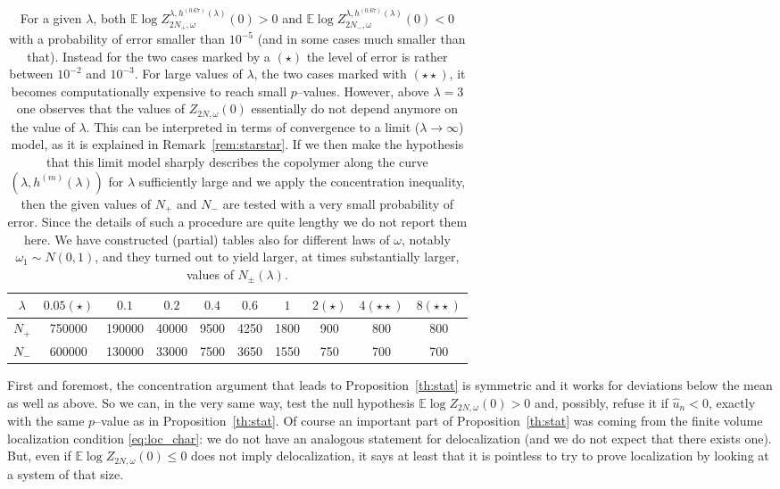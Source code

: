 \documentclass[reqno,11pt]{amsart}
\numberwithin{equation}{section}
\newcommand{\bbE}{{\ensuremath{\mathbb E}} }
\newcommand{\go}{\omega}
\newcommand{\gl}{\lambda}
\begin{document}
\begin{table}[h]
\begin{center}
\begin{tabular}{|c|c|c|c|c|c|c|c|c|c|}
\hline
$\gl $ &$0.05 (\star)$&$0.1$&$0.2$&$0.4$&$0.6$&$1$&$2(\star)$&$4(\star\star )$&$8(\star\star )$\\
\hline
$N_+$&750000&190000&40000&9500&4250&1800&900&800&800\\
\hline
$N_-$&600000&130000&33000&7500&3650&1550&750&700&700\\
\hline
\end{tabular}
\end{center}
\caption{\label{tbl:2}
For a given $\gl$, both $\bbE \log Z_{2N_+,\go}^{\gl,h^{(0.67)}(\gl)}(0)  >0$ and
$\bbE \log Z_{2N_-,\go}^{\gl,h^{(0.67)}(\gl)}(0)  <0$ with a probability of error
smaller than $10^{-5}$ (and in some cases much smaller than that).
Instead for the two cases marked by a $(\star)$ the level of error
is rather between $10^{-2}$ and  $10^{-3}$. For large values of $\gl$, the two cases marked with
 $(\star \star)$, it becomes computationally
expensive to reach small $p$--values. However, above $\gl=3$ one observes
that the values of $Z_{2N,\go}(0)$
essentially do not depend anymore on the value of $\gl$. This can be interpreted
in terms of convergence to a limit ($\gl \to \infty$) model, as it is explained in Remark~\ref{rem:starstar}.
If we then make the hypothesis that this limit model sharply describes the
copolymer along the curve $(\gl, h^{(m)}(\gl))$ for $\gl$ sufficiently large and we apply the concentration
inequality, then the given values of $N_+$  and $N_-$ are tested
with a very small probability of error. Since the details of such a procedure are
quite lengthy we do not report them here.
We have constructed (partial) tables also for different laws of $\go$,
notably $\go_1 \sim N(0,1)$,  and they turned out
to yield larger, at times substantially larger, values of $N_\pm (\gl)$. %
}
\end{table}

First and foremost, the concentration argument
that leads to Proposition~\ref{th:stat} is symmetric
and it works for deviations below the mean as well as above.
So we can, in the very same way, test the null hypothesis
$\bbE\log Z_{2N, \go}(0)> 0$ and, possibly,  refuse it
if $\hat u _n <0$, exactly with the same $p$--value
as in Proposition~\ref{th:stat}.
Of course an important part of Proposition~\ref{th:stat} was coming
from the finite volume localization condition \eqref{eq:loc_char}:
 we do not have an analogous statement for delocalization
(and we do not expect that there exists one).
But, even if $\bbE\log Z_{2N, \go}(0)\le 0$ does not imply delocalization,
it says at least that it is pointless to try to prove localization
by looking at a system of that size.
\end{document}
